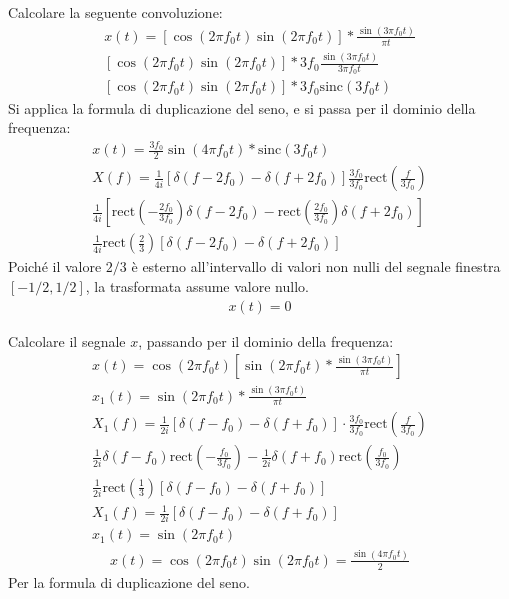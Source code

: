 \documentclass{article}
\newcommand{\rect}{\mbox{rect}}
\newcommand{\sinc}{\mbox{sinc}}
\begin{document}
Calcolare la seguente convoluzione:
\begin{gather*}
    x(t)=\left[\cos(2\pi f_0t)\sin(2\pi f_0t)\right]*\displaystyle\frac{\sin(3\pi f_0t)}{\pi t}\\
    \left[\cos(2\pi f_0t)\sin(2\pi f_0t)\right]*\displaystyle3f_0\frac{\sin(3\pi f_0t)}{3\pi f_0t}\\
    \left[\cos(2\pi f_0t)\sin(2\pi f_0t)\right]*3f_0\sinc(3f_0 t)
\end{gather*}
Si applica la formula di duplicazione del seno, e si passa per il dominio della frequenza:
\begin{gather*}
    x(t)=\displaystyle\frac{3f_0}{2}\sin(4\pi f_0t)*\sinc(3f_0t)\\
    X(f)=\displaystyle\frac{1}{4i}\left[\delta(f-2f_0)-\delta(f+2f_0)\right]\frac{3f_0}{3f_0}\rect\left(\frac{f}{3f_0}\right)\\
    \displaystyle\frac{1}{4i}\left[\rect\left(-\frac{2f_0}{3f_0}\right)\delta(f-2f_0)-\rect\left(\frac{2f_0}{3f_0}\right)\delta(f+2f_0)\right]\\
    \displaystyle\frac{1}{4i}\rect\left(\frac{2}{3}\right)\left[\delta(f-2f_0)-\delta(f+2f_0)\right]
\end{gather*}
Poiché il valore $2/3$ è esterno all'intervallo di valori non nulli del segnale finestra $[-1/2,1/2]$, la trasformata assume valore nullo. 
\begin{gather}
    x(t)=0
\end{gather}


Calcolare il segnale $x$, passando per il dominio della frequenza:
\begin{gather*}
    x(t)=\cos(2\pi f_0t)\left[\sin(2\pi f_0t)*\displaystyle\frac{\sin(3\pi f_0t)}{\pi t}\right]\\
    x_1(t)=\sin(2\pi f_0t)*\displaystyle\frac{\sin(3\pi f_0t)}{\pi t}\\
    X_1(f)=\displaystyle\frac{1}{2i}\left[\delta(f-f_0)-\delta(f+f_0)\right]\cdot \frac{3f_0}{3f_0}\rect\left(\frac{f}{3f_0}\right)\\
    \displaystyle\frac{1}{2i}\delta(f-f_0)\rect\left(-\frac{f_0}{3f_0}\right)-\frac{1}{2i}\delta(f+f_0)\rect\left(\frac{f_0}{3f_0}\right)\\
    \displaystyle\frac{1}{2i}\rect\left(\frac{1}{3}\right)\left[\delta(f-f_0)-\delta(f+f_0)\right]\\
    X_1(f)=\displaystyle\frac{1}{2i}\left[\delta(f-f_0)-\delta(f+f_0)\right]\\
    x_1(t)=\sin(2\pi f_0t)
\end{gather*}
\begin{gather}
    x(t)=\cos(2\pi f_0t)\sin(2\pi f_0t)=\displaystyle\frac{\sin(4\pi f_0t)}{2}
\end{gather}
Per la formula di duplicazione del seno. 
\end{document}

